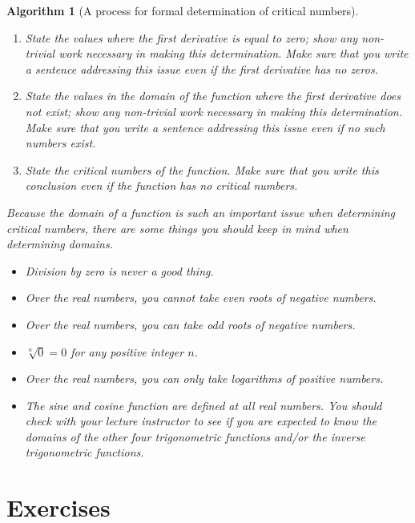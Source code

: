 \documentclass[12pt,]{book}
\theoremstyle{plain}
\newtheorem{algorithm}[theorem]{Algorithm}
\theoremstyle{definition}
\numberwithin{equation}{section}
\begin{document}
\begin{algorithm}[A process for formal determination of critical numbers]
\begin{enumerate}
                \item{}State the values where the first derivative is equal to zero; show any non-trivial work necessary in making this determination.  Make sure that you write a sentence addressing this issue even if the first derivative has no zeros.\item{}State the values \emph{in the domain of the function} where the first derivative does not exist; show any non-trivial work necessary in making this determination.    Make sure that you write a sentence addressing this issue even if no such numbers exist.\item{}State the critical numbers of the function.  Make sure that you write this conclusion even if the function has no critical numbers.\end{enumerate}
\par
Because the domain of a function is such an important issue when determining critical numbers, there are some things you should keep in mind when determining domains.%
\begin{itemize}[label=\textbullet]
\item{}Division by zero is never a good thing.\item{}Over the real numbers, you \emph{cannot} take \emph{even} roots of negative numbers.\item{}Over the real numbers, you \emph{can} take \emph{odd} roots of negative numbers.\item{}\(\sqrt[n]{0}=0\) for any positive integer \(n\).\item{}Over the real numbers, you can only take logarithms of positive numbers.\item{}The sine and cosine function are defined at all real numbers.  You should check with your lecture instructor to see if you are expected to know the domains of the other four trigonometric functions and/or the inverse trigonometric functions.\end{itemize}
\end{algorithm}
\typeout{************************************************}
\typeout{************************************************}
\section*{Exercises}\label{exercises-3}
\end{document}
